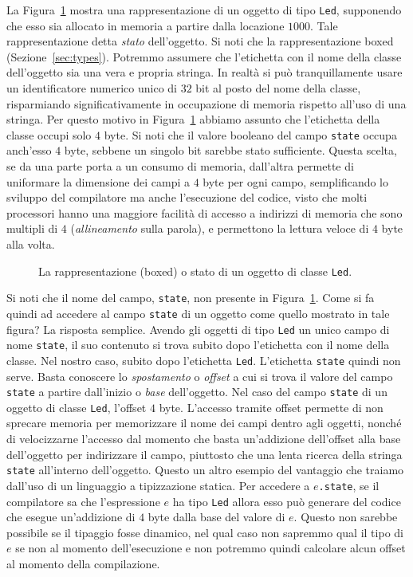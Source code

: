 La Figura~\ref{fig:object} mostra una rappresentazione di un oggetto di
tipo \texttt{Led}, supponendo che esso sia allocato in memoria a partire
dalla locazione $1000$. Tale rappresentazione \e detta
\emph{stato} dell'oggetto. Si noti che la rappresentazione \e boxed
(Sezione~\ref{sec:types}). Potremmo assumere che l'etichetta
con il nome della classe dell'oggetto sia una vera e propria stringa.
In realt\`a si pu\`o tranquillamente usare un identificatore numerico unico
di $32$ bit
al posto del nome della classe, risparmiando significativamente in occupazione
di memoria rispetto all'uso di una stringa. Per questo
motivo in Figura~\ref{fig:object}
abbiamo assunto che l'etichetta della classe occupi solo $4$ byte.
Si noti che il valore booleano del campo \texttt{state} occupa anch'esso
$4$ byte, sebbene un singolo bit sarebbe stato sufficiente. Questa
scelta, se da una parte porta a un consumo di memoria, dall'altra permette
di uniformare la dimensione dei campi a $4$ byte per ogni campo, semplificando
lo sviluppo del compilatore ma anche l'esecuzione del codice, visto che
molti processori hanno una maggiore facilit\`a di accesso a indirizzi
di memoria che sono multipli di $4$ (\emph{allineamento} sulla parola),
e permettono la lettura veloce di $4$ byte alla volta.
%
\begin{figure}
\begin{center}
\end{center}
\caption{La rappresentazione (boxed) o stato di un oggetto di classe \texttt{Led}.}
  \label{fig:object}
\end{figure}

Si noti che il nome del campo, \texttt{state}, non \e presente
in Figura~\ref{fig:object}. Come si fa quindi ad accedere al campo
\texttt{state} di un oggetto come quello mostrato in tale figura?
La risposta \e semplice. Avendo gli oggetti di tipo \texttt{Led} un unico
campo di nome \texttt{state}, il suo contenuto si trova subito dopo
l'etichetta con il nome della classe. Nel nostro caso, subito dopo
l'etichetta \texttt{Led}. L'etichetta \texttt{state} quindi non serve.
Basta conoscere lo \emph{spostamento} o \emph{offset} a cui si trova
il valore del campo \texttt{state} a partire dall'inizio o \emph{base}
dell'oggetto. Nel caso del campo \texttt{state} di un oggetto di classe
\texttt{Led}, l'offset \e $4$ byte. L'accesso tramite offset permette
di non sprecare memoria per memorizzare il nome dei campi dentro agli
oggetti, nonch\'e di velocizzarne l'accesso dal momento che
basta un'addizione dell'offset alla base dell'oggetto per indirizzare il campo,
piuttosto che una lenta ricerca della stringa \texttt{state} all'interno
dell'oggetto. Questo \e un altro esempio del vantaggio che traiamo dall'uso
di un linguaggio a tipizzazione statica. Per accedere a $e$\texttt{.state},
se il compilatore sa che l'espressione $e$ ha tipo \texttt{Led} allora
esso pu\`o generare del codice che esegue
un'addizione di $4$ byte dalla base del valore di $e$. Questo non sarebbe
possibile se il tipaggio fosse dinamico, nel qual caso non sapremmo
qual \e il tipo di $e$ se non al momento dell'esecuzione e non potremmo
quindi calcolare alcun offset al momento della compilazione.
%
